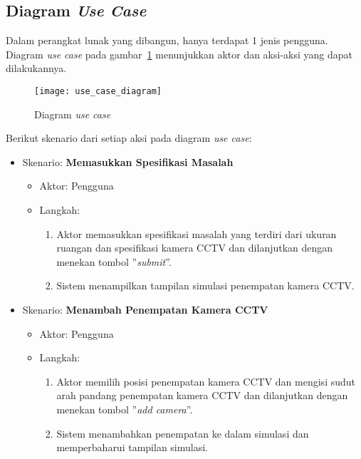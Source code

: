 \subsection{Diagram \textit{Use Case}}
Dalam perangkat lunak yang dibangun, hanya terdapat 1 jenis pengguna. Diagram \textit{use case} pada gambar~\ref{fig:use_case_diagram} menunjukkan aktor dan aksi-aksi yang dapat dilakukannya.
\begin{figure}[h]
	\centering  
	\texttt{[image: use\_case\_diagram]}
	\caption[Diagram \textit{use case}]{Diagram \textit{use case}}
	\label{fig:use_case_diagram}
\end{figure}

Berikut skenario dari setiap aksi pada diagram \textit{use case}:
\begin{itemize}
	\item Skenario: \textbf{Memasukkan Spesifikasi Masalah}
	\begin{itemize}
		\item Aktor: Pengguna
		\item Langkah:
		\begin{enumerate}
			\item Aktor memasukkan spesifikasi masalah yang terdiri dari ukuran ruangan dan spesifikasi kamera CCTV dan dilanjutkan dengan menekan tombol ''\textit{submit}''.
			\item Sistem menampilkan tampilan simulasi penempatan kamera CCTV.
		\end{enumerate}
	\end{itemize}
	\item Skenario: \textbf{Menambah Penempatan Kamera CCTV}
	\begin{itemize}
		\item Aktor: Pengguna
		\item Langkah:
		\begin{enumerate}
			\item Aktor memilih posisi penempatan kamera CCTV dan mengisi sudut arah pandang penempatan kamera CCTV dan dilanjutkan dengan menekan tombol ''\textit{add camera}''.
			\item Sistem menambahkan penempatan ke dalam simulasi dan memperbaharui tampilan simulasi.
		\end{enumerate}
	\end{itemize}

\end{itemize}

